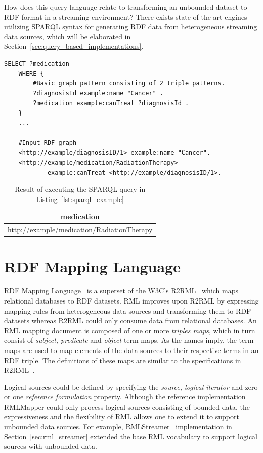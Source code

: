 How does this query language relate to transforming an 
unbounded dataset to RDF format in a streaming environment? There exists state-of-the-art 
engines utilizing SPARQL syntax for generating RDF data from heterogeneous streaming data sources, which will be 
elaborated in Section~\ref{sec:query_based_implementations}. 

\begin{lstlisting}[language=SPARQL,
    caption={Example of a SPARQL query of a medication on the given input.}, 
    label={lst:sparql_example}]
    SELECT ?medication
    WHERE {
        #Basic graph pattern consisting of 2 triple patterns. 
        ?diagnosisId example:name "Cancer" .
        ?medication example:canTreat ?diagnosisId .
    }
    ...
    ---------
    #Input RDF graph
    <http://example/diagnosisID/1> example:name "Cancer". 
    <http://example/medication/RadiationTherapy> 
            example:canTreat <http://example/diagnosisID/1>.
\end{lstlisting}
\begin{table}[!htbp]
    \centering
    \begin{tabular}{|c|}
    \hline
    \textbf{medication}        \\ \hline
    http://example/medication/RadiationTherapy\\ \hline
    \end{tabular}
    \caption{Result of executing the SPARQL query in Listing~\ref{lst:sparql_example}}
    \label{tab:sparql_result}
\end{table}


\section{RDF Mapping Language}
RDF Mapping Language~\cite{rml} is a superset of the W3C's R2RML~\cite{r2rml} which maps relational databases to
RDF datasets. RML improves upon R2RML by expressing mapping rules from heterogeneous
data sources and transforming them to RDF datasets whereas R2RML could only consume
data from relational databases. An RML mapping document is composed of one or more \emph{triples maps}, 
which in turn consist of \emph{subject, predicate} and \emph{object} term maps. As the names imply, 
the term maps are used to map elements of the data sources to their respective terms 
in an RDF triple. The definitions of these maps are similar to the 
specifications in R2RML~\cite{rml_tech}. 

Logical sources could be defined by specifying the \emph{source, logical iterator} 
and zero or one \emph{reference formulation} property.
Although the reference implementation RMLMapper could only process logical sources 
consisting of bounded data, the expressiveness and the flexibility of RML allows one 
to extend it to support unbounded data sources. For example, RMLStreamer~\cite{rml_streamer} implementation in 
Section~\ref{sec:rml_streamer} extended the base RML vocabulary to support logical sources with unbounded data. 

